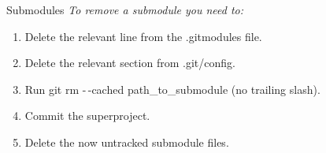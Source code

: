 \begin{frame}[fragile]{Submodules}
    \emph{To remove a submodule you need to:}
    \vspace{1cm}

    \begin{enumerate}
        \item Delete the relevant line from the .gitmodules file.
        \item Delete the relevant section from .git/config.
        \item Run git rm -\,-cached path\_to\_submodule (no trailing slash).
        \item Commit the superproject.
        \item Delete the now untracked submodule files.
    \end{enumerate}
\end{frame}

